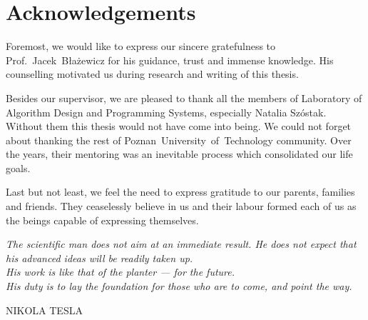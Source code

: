 \chapter*{Acknowledgements}

Foremost, we would like to express our sincere gratefulness to Prof.~Jacek~Błażewicz for his guidance, trust and immense knowledge. His counselling motivated us during research and writing of this thesis.

Besides our supervisor, we are pleased to thank all the members of Laboratory of Algorithm Design and Programming Systems, especially Natalia Szóstak. Without them this thesis would not have come into being. We could not forget about thanking the rest of Poznan~University~of~Technology community. Over the years, their mentoring was an inevitable process which consolidated our life goals. 

Last but not least, we feel the need to express gratitude to our parents, families and friends. They ceaselessly believe in us and their labour formed each of us as the beings capable of expressing themselves.


{
\null\vfill\hfill
\settowidth{}
\centering
\parbox{\longest}{%
  \raggedright{\itshape%
  The scientific man does not aim
  at an immediate result. He does not
  expect that his advanced ideas
  will be readily taken up. \\
  \vspace{\baselineskip}
  His work is like that of the planter --- for the future. \\ 
  His duty is to lay the foundation for those who are to come, and point the way.\par\bigskip
  }   
  \raggedleft\MakeUppercase{Nikola Tesla}\par%
}
}
